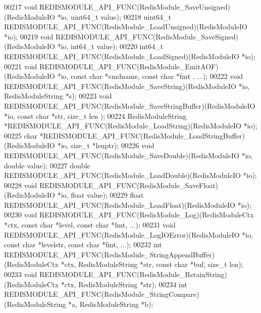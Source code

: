 \begin{DoxyCode}
00217 \textcolor{keywordtype}{void} REDISMODULE\_API\_FUNC(RedisModule\_SaveUnsigned)(RedisModuleIO *io, uint64\_t value);
00218 uint64\_t REDISMODULE\_API\_FUNC(RedisModule\_LoadUnsigned)(RedisModuleIO *io);
00219 \textcolor{keywordtype}{void} REDISMODULE\_API\_FUNC(RedisModule\_SaveSigned)(RedisModuleIO *io, int64\_t value);
00220 int64\_t REDISMODULE\_API\_FUNC(RedisModule\_LoadSigned)(RedisModuleIO *io);
00221 \textcolor{keywordtype}{void} REDISMODULE\_API\_FUNC(RedisModule\_EmitAOF)(RedisModuleIO *io, \textcolor{keyword}{const} \textcolor{keywordtype}{char} *cmdname, \textcolor{keyword}{const} \textcolor{keywordtype}{char} *fmt
      , ...);
00222 \textcolor{keywordtype}{void} REDISMODULE\_API\_FUNC(RedisModule\_SaveString)(RedisModuleIO *io, RedisModuleString *s);
00223 \textcolor{keywordtype}{void} REDISMODULE\_API\_FUNC(RedisModule\_SaveStringBuffer)(RedisModuleIO *io, \textcolor{keyword}{const} \textcolor{keywordtype}{char} *str, size\_t len
      );
00224 RedisModuleString *REDISMODULE\_API\_FUNC(RedisModule\_LoadString)(RedisModuleIO *io);
00225 \textcolor{keywordtype}{char} *REDISMODULE\_API\_FUNC(RedisModule\_LoadStringBuffer)(RedisModuleIO *io, size\_t *lenptr);
00226 \textcolor{keywordtype}{void} REDISMODULE\_API\_FUNC(RedisModule\_SaveDouble)(RedisModuleIO *io, \textcolor{keywordtype}{double} value);
00227 \textcolor{keywordtype}{double} REDISMODULE\_API\_FUNC(RedisModule\_LoadDouble)(RedisModuleIO *io);
00228 \textcolor{keywordtype}{void} REDISMODULE\_API\_FUNC(RedisModule\_SaveFloat)(RedisModuleIO *io, \textcolor{keywordtype}{float} value);
00229 \textcolor{keywordtype}{float} REDISMODULE\_API\_FUNC(RedisModule\_LoadFloat)(RedisModuleIO *io);
00230 \textcolor{keywordtype}{void} REDISMODULE\_API\_FUNC(RedisModule\_Log)(RedisModuleCtx *ctx, \textcolor{keyword}{const} \textcolor{keywordtype}{char} *level, \textcolor{keyword}{const} \textcolor{keywordtype}{char} *fmt, 
      ...);
00231 \textcolor{keywordtype}{void} REDISMODULE\_API\_FUNC(RedisModule\_LogIOError)(RedisModuleIO *io, \textcolor{keyword}{const} \textcolor{keywordtype}{char} *levelstr, \textcolor{keyword}{const} \textcolor{keywordtype}{char} 
      *fmt, ...);
00232 \textcolor{keywordtype}{int} REDISMODULE\_API\_FUNC(RedisModule\_StringAppendBuffer)(RedisModuleCtx *ctx, RedisModuleString *str, \textcolor{keyword}{
      const} \textcolor{keywordtype}{char} *buf, size\_t len);
00233 \textcolor{keywordtype}{void} REDISMODULE\_API\_FUNC(RedisModule\_RetainString)(RedisModuleCtx *ctx, RedisModuleString *str);
00234 \textcolor{keywordtype}{int} REDISMODULE\_API\_FUNC(RedisModule\_StringCompare)(RedisModuleString *a, RedisModuleString *b);

\end{DoxyCode}
